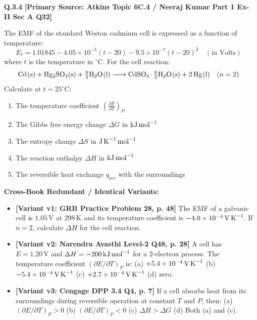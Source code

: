 \begin{problembox}
\textbf{Q.3.4} \hfill \textbf{[Primary Source: Atkins Topic 6C.4 / Neeraj Kumar Part 1 Ex-II Sec A Q32]}
\label{q:qb-c3-04}

The EMF of the standard Weston cadmium cell is expressed as a function of temperature:
\begin{equation*}
    E_t = 1.01845 - 4.05 \times 10^{-5}(t - 20) - 9.5 \times 10^{-7}(t - 20)^2 \quad (\text{in Volts})
\end{equation*}
where $t$ is the temperature in $^\circ\text{C}$. For the cell reaction:
\begin{equation*}
    \ce{Cd(s) + Hg2SO4(s) + \tfrac{8}{3}H2O(l) -> CdSO4.\tfrac{8}{3}H2O(s) + 2Hg(l)} \quad (n = 2)
\end{equation*}
Calculate at $t = 25^\circ\text{C}$:
\begin{enumerate}[label=(\alph*)]
    \item The temperature coefficient $\left(\frac{\partial E}{\partial T}\right)_P$
    \item The Gibbs free energy change $\Delta G$ in $\text{kJ\,mol}^{-1}$
    \item The entropy change $\Delta S$ in $\text{J\,K}^{-1}\,\text{mol}^{-1}$
    \item The reaction enthalpy $\Delta H$ in $\text{kJ\,mol}^{-1}$
    \item The reversible heat exchange $q_{\text{rev}}$ with the surroundings
\end{enumerate}

\tcbline
\textbf{\color{accentamber}Cross-Book Redundant / Identical Variants:}
\begin{itemize}[leftmargin=*,itemsep=2pt]
    \item \textbf{[Variant v1: GRB Practice Problem 28, p. 48]} The EMF of a galvanic cell is $1.05\,\text{V}$ at $298\,\text{K}$ and its temperature coefficient is $-4.0 \times 10^{-4}\,\text{V\,K}^{-1}$. If $n = 2$, calculate $\Delta H$ for the cell reaction.
    \item \textbf{[Variant v2: Narendra Avasthi Level-2 Q48, p. 28]} A cell has $E = 1.20\,\text{V}$ and $\Delta H = -200\,\text{kJ\,mol}^{-1}$ for a $2$-electron process. The temperature coefficient $(\partial E/\partial T)_P$ is: (a) $+5.4 \times 10^{-4}\,\text{V\,K}^{-1}$ (b) $-5.4 \times 10^{-4}\,\text{V\,K}^{-1}$ (c) $+2.7 \times 10^{-4}\,\text{V\,K}^{-1}$ (d) zero.
    \item \textbf{[Variant v3: Cengage DPP 3.4 Q4, p. 7]} If a cell absorbs heat from its surroundings during reversible operation at constant $T$ and $P$, then: (a) $(\partial E/\partial T)_P > 0$ (b) $(\partial E/\partial T)_P < 0$ (c) $\Delta H > \Delta G$ (d) Both (a) and (c).
\end{itemize}
\end{problembox}
